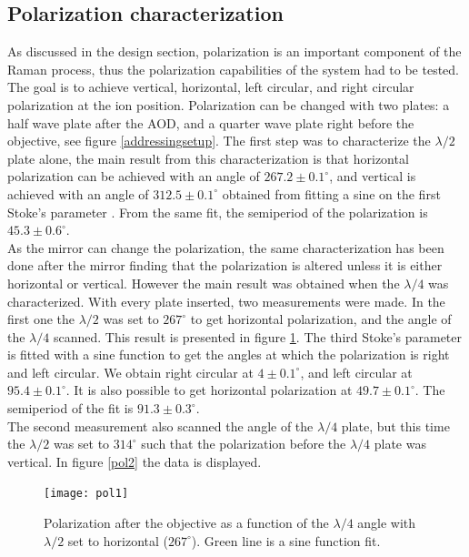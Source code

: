 \subsection{Polarization characterization}
As discussed in the design section, polarization is an important component of the Raman process, thus the polarization capabilities of the system had to be tested. The goal is to achieve vertical, horizontal, left circular, and right circular polarization at the ion position. Polarization can be changed with two plates: a half wave plate after the AOD, and a quarter wave plate right before the objective, see figure \ref{addressingsetup}. The first step was to characterize the $\lambda/2$ plate alone, the main result from this characterization is that horizontal polarization can be achieved with an angle of $267.2\pm 0.1 ^{\circ}$, and vertical is achieved with an angle of $312.5\pm0.1^{\circ}$ obtained from fitting a sine on the first Stoke's parameter \cite{stokes}. From the same fit, the semiperiod of the polarization is $45.3\pm 0.6^\circ$.\\
As the mirror can change the polarization, the same characterization has been done after the mirror finding that the polarization is altered unless it is either horizontal or vertical.
However the main result was obtained when the $\lambda/4$ was characterized. With every plate inserted, two measurements were made. In the first one the $\lambda/2$ was set to $267^\circ$ to get horizontal polarization, and the angle of the $\lambda/4$ scanned. This result is presented in figure \ref{pol1}. The third Stoke's parameter is fitted with a sine function to get the angles at which the polarization is right and left circular. We obtain right circular at $4\pm 0.1^\circ$, and left circular at $95.4\pm0.1^\circ$. It is also possible to get horizontal polarization at $49.7\pm0.1^\circ$. The semiperiod of the fit is $91.3\pm 0.3^\circ$.\\
The second measurement also scanned the angle of the $\lambda/4$ plate, but this time the $\lambda/2$ was set to $314^\circ$ such that the polarization before the $\lambda/4$ plate was vertical. In figure \ref{pol2} the data is displayed.

\begin{figure}
\centering
\texttt{[image: pol1]}
\caption{Polarization after the objective as a function of the $\lambda/4$ angle with $\lambda/2$ set to horizontal ($267^\circ$). Green line is a sine function fit.}
\label{pol1}
\end{figure}

